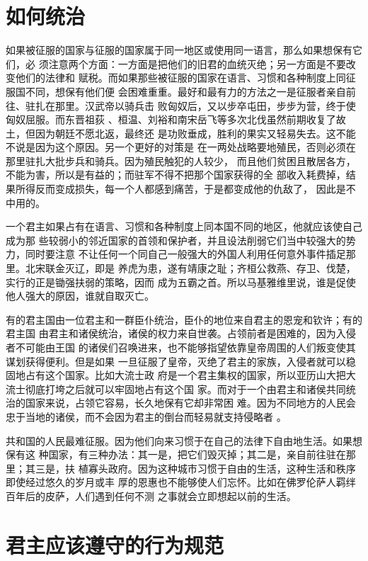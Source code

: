 \section{如何统治}

如果被征服的国家与征服的国家属于同一地区或使用同一语言，那么如果想保有它们，必
须注意两个方面：一方面是把他们的旧君的血统灭绝；另一方面是不要改变他们的法律和
赋税。而如果那些被征服的国家在语言、习惯和各种制度上同征服国不同，想保有他们便
会困难重重。最好和最有力的方法之一是征服者亲自前往、驻扎在那里。汉武帝以骑兵击
败匈奴后，又以步卒屯田，步步为营，终于使匈奴屈服\parencite{qianmu}。而东晋祖荻
、桓温、刘裕和南宋岳飞等多次北伐虽然前期收复了故土，但因为朝廷不愿北返，最终还
是功败垂成，胜利的果实又轻易失去。这不能不说是因为这个原因。另一个更好的对策是
在一两处战略要地殖民，否则必须在那里驻扎大批步兵和骑兵。因为殖民触犯的人较少，
而且他们贫困且散居各方，不能为害，所以是有益的；而驻军不得不把那个国家获得的全
部收入耗费掉，结果所得反而变成损失，每一个人都感到痛苦，于是都变成他的仇敌了，
因此是不中用的。

一个君主如果占有在语言、习惯和各种制度上同本国不同的地区，他就应该使自己成为那
些较弱小的邻近国家的首领和保护者，并且设法削弱它们当中较强大的势力，同时要注意
不让任何一个同自己一般强大的外国人利用任何意外事件插足那里。北宋联金灭辽，即是
养虎为患，遂有靖康之耻；齐桓公救燕、存卫、伐楚，实行的正是锄强扶弱的策略，因而
成为五霸之首。所以马基雅维里说，谁是促使他人强大的原因，谁就自取灭亡。

有的君主国由一位君主和一群臣仆统治，臣仆的地位来自君主的恩宠和钦许；有的君主国
由君主和诸侯统治，诸侯的权力来自世袭。占领前者是困难的，因为入侵者不可能由王国
的诸侯们召唤进来，也不能够指望依靠皇帝周围的人们叛变使其谋划获得便利。但是如果
一旦征服了皇帝，灭绝了君主的家族，入侵者就可以稳固地占有这个国家。比如大流士政
府是一个君主集权的国家，所以亚历山大把大流士彻底打垮之后就可以牢固地占有这个国
家。而对于一个由君主和诸侯共同统治的国家来说，占领它容易，长久地保有它却非常困
难。因为不同地方的人民会忠于当地的诸侯，而不会因为君主的倒台而轻易就支持侵略者
。

共和国的人民最难征服。因为他们向来习惯于在自己的法律下自由地生活。如果想保有这
种国家，有三种办法：其一是，把它们毁灭掉；其二是，亲自前往驻在那里；其三是，扶
植寡头政府。因为这种城市习惯于自由的生活，这种生活和秩序即使经过悠久的岁月或丰
厚的恩惠也不能够使人们忘怀。比如在佛罗伦萨人羁绊百年后的皮萨，人们遇到任何不测
之事就会立即想起以前的生活。

\section{君主应该遵守的行为规范}

